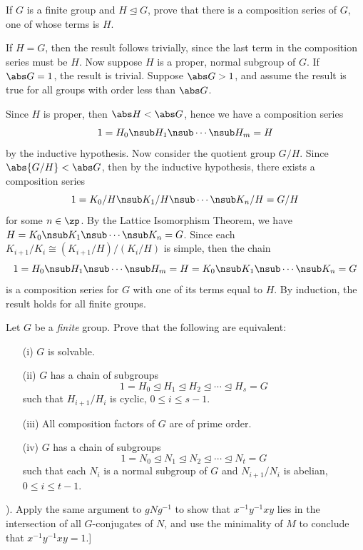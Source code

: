 \begin{exercise}\label{ex3.4.7}
    If $G$ is a finite group and $H \trianglelefteq G$, prove that there is a composition series of $G$, one of whose terms is $H$.
\end{exercise}

\begin{sol}
    If $H = G$, then the result follows trivially, since the last term in the composition series must be $H$. Now suppose $H$ is a proper, normal subgroup of $G$. If $\abs G = 1$, the result is trivial. Suppose $\abs G > 1$, and assume the result is true for all groups with order less than $\abs G$.

    Since $H$ is proper, then $\abs H < \abs G$, hence we have a composition series
    \[1 = H_0 \nsub H_1 \nsub \cdots \nsub H_m = H\]
    by the inductive hypothesis. Now consider the quotient group $G/H$. Since $\abs{G/H} < \abs G$, then by the inductive hypothesis, there exists a composition series
    \[1 = K_0/H \nsub K_1/H \nsub \cdots \nsub K_n/H = G/H\]
    for some $n \in \zp$. By the Lattice Isomorphism Theorem, we have $H = K_0 \nsub K_1 \nsub \cdots \nsub K_n = G$. Since each $K_{i + 1}/K_i \cong (K_{i + 1}/H)/(K_i/H)$ is simple, then the chain
    \[1 = H_0 \nsub H_1 \nsub \cdots \nsub H_m = H = K_0 \nsub K_1 \nsub \cdots \nsub K_n = G\]
    is a composition series for $G$ with one of its terms equal to $H$. By induction, the result holds for all finite groups.
\end{sol}

\begin{exercise}\label{ex3.4.8}
    Let $G$ be a \emph{finite} group. Prove that the following are equivalent:
    \begin{enumerate}
        \item[(i)] $G$ is solvable.
        \item[(ii)] $G$ has a chain of subgroups
        \[1 = H_0 \trianglelefteq H_1 \trianglelefteq H_2 \trianglelefteq \cdots \trianglelefteq H_s = G\]
        such that $H_{i+1}/H_i$ is cyclic, $0 \le i \le s-1$.
        \item[(iii)] All composition factors of $G$ are of prime order.
        \item[(iv)] $G$ has a chain of subgroups
        \[1 = N_0 \trianglelefteq N_1 \trianglelefteq N_2 \trianglelefteq \cdots \trianglelefteq N_t = G\]
        such that each $N_i$ is a normal subgroup of $G$ and $N_{i+1}/N_i$ is abelian, $0 \le i \le t-1$.
    \end{enumerate}
    \noindent [For (iv), prove that a minimal nontrivial normal subgroup $M$ of $G$ is necessarily abelian and then use induction. To see that $M$ is abelian, let $N \trianglelefteq M$ be of prime index (by (iii)) and show that $x^{-1}y^{-1}xy \in N$ for all $x,y \in M$ (cf. \hyperref[ex3.1.40]{Exercise 3.1.40}). Apply the same argument to $gNg^{-1}$ to show that $x^{-1}y^{-1}xy$ lies in the intersection of all $G$-conjugates of $N$, and use the minimality of $M$ to conclude that $x^{-1}y^{-1}xy = 1$.]
\end{exercise}


